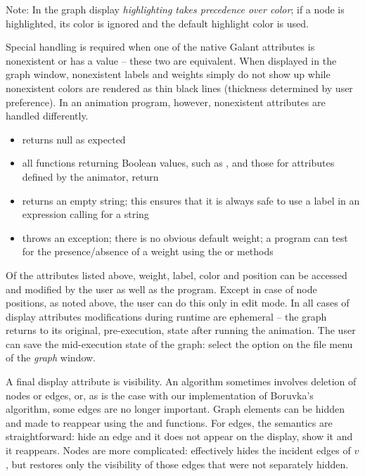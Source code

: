 Note: In the graph display \emph{highlighting takes precedence over color};
if a node is highlighted, its color is ignored and the default highlight
color is used.

Special handling is required when one of the native Galant attributes
is nonexistent or has a
 value -- these two are equivalent.
When displayed in the graph window, nonexistent labels and weights simply do
not show up while nonexistent colors are rendered as thin black lines
(thickness determined by user preference).
In an animation program, however, nonexistent attributes are handled
differently.
\begin{itemize}
\item {} returns null as expected
\item all functions returning Boolean values, such as ,
   and those for attributes defined by the animator, return
\item {} returns an empty string; this ensures that it is always
  safe to use a label in an expression calling for a string
\item {} throws an exception; there is no obvious default
  weight; a program can test for the presence/absence of a weight using the
   or  methods
\end{itemize}

Of the attributes listed above, weight, label, color and position can be
accessed and modified by the user as well as the program.
Except in case of node positions, as noted above,
the user can do this only in edit mode.
In all cases of display attributes
modifications during runtime are ephemeral
-- the graph returns to its original, pre-execution, state after running the
animation.
The user can save the mid-execution state of the graph:
select the  option on the file menu of the
\emph{graph} window.

A final display attribute is visibility. An algorithm sometimes involves
deletion of nodes or edges, or, as is the case with our implementation of
Boruvka's algorithm, some edges are no longer important.
Graph elements can be hidden and made to reappear using the  and
 functions.
For edges, the semantics are straightforward: hide an edge and it does not
appear on the display, show it and it reappears.
Nodes are more complicated:  effectively hides the incident
edges of $v$,
but  restores only the visibility of those edges
that were not separately hidden.

